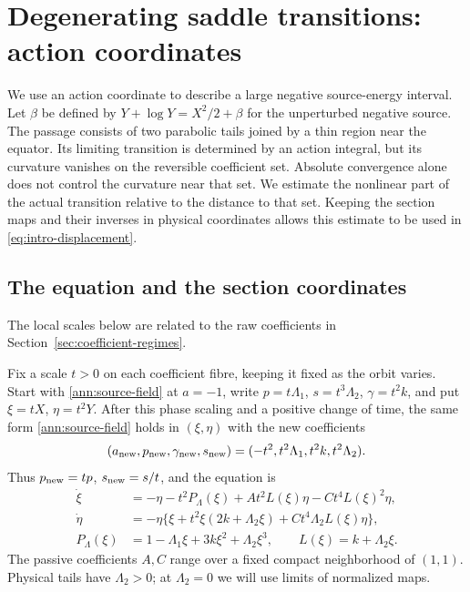 \section{Degenerating saddle transitions: action coordinates}
\label{sec:negative-action}

We use an action coordinate to describe a large negative
source-energy interval. Let \(\beta\) be
defined by \(Y+\log Y=X^2/2+\beta\) for the unperturbed negative source.
The passage consists of two parabolic tails joined by a thin region near
the equator. Its limiting transition is determined by an action integral,
but its curvature vanishes on the reversible coefficient set. Absolute
convergence alone does not control the curvature near that set. We estimate
the nonlinear part of the actual transition relative to the distance to
that set. Keeping the section maps and their inverses in physical
coordinates allows this estimate to be used in
\eqref{eq:intro-displacement}.

\subsection{The equation and the section coordinates}

The local scales below are related to the raw coefficients in
Section~\ref{sec:coefficient-regimes}.

Fix a scale \(t>0\) on each coefficient fibre, keeping it fixed as
the orbit varies. Start with \eqref{ann:source-field} at \(a=-1\),
write \(p=t\Lambda_1\), \(s=t^3\Lambda_2\),
\(\gamma=t^2k\), and put \(\xi=tX\), \(\eta=t^2Y\).
After this phase scaling and a positive change of time, the same
form \eqref{ann:source-field} holds in $(\xi,\eta)$ with the new
coefficients
\begin{equation}\label{neg:source-dictionary}
 (a_{\rm new},p_{\rm new},\gamma_{\rm new},s_{\rm new})
 =(-t^2,t^2\Lambda_1,t^2k,t^2\Lambda_2).
\end{equation}
Thus \(p_{\rm new}=tp\), \(s_{\rm new}=s/t\), and the equation is
\begin{equation}\label{neg:field}
\begin{split}
 \dot\xi&=-\eta-t^2P_\Lambda(\xi)
                +At^2L(\xi)\eta-Ct^4L(\xi)^2\eta,\\
 \dot\eta&=-\eta\{\xi+t^2\xi(2k+\Lambda_2\xi)
                         +Ct^4\Lambda_2L(\xi)\eta\},\\
 P_\Lambda(\xi)&=1-\Lambda_1\xi+3k\xi^2+\Lambda_2\xi^3,
 \qquad L(\xi)=k+\Lambda_2\xi .
\end{split}
\end{equation}
The passive coefficients \(A,C\) range over a fixed compact
neighborhood of \((1,1)\). Physical tails have \(\Lambda_2>0\);
at \(\Lambda_2=0\) we will use limits of normalized maps.

